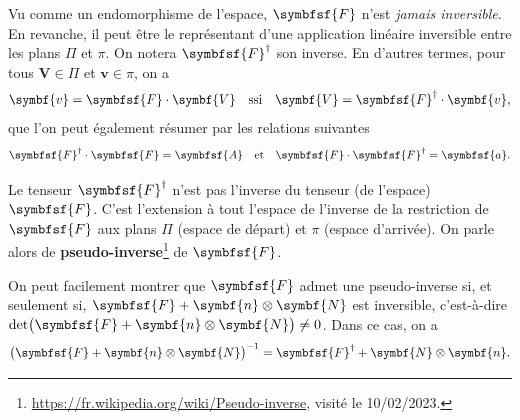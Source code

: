 \documentclass[
  a4paper,
  DIV=11,
  numbers=noendperiod]{scrreprt}
\newcommand{\tens}[1]{\symbfsf{#1}}
\renewcommand{\vec}[1]{\symbf{#1}}
\begin{document}
Vu comme un endomorphisme de l'espace, \(\tens{F}\) n'est \emph{jamais
inversible}. En revanche, il peut être le représentant d'une application
linéaire inversible entre les plans \(\Pi\) et \(\pi\). On notera
\(\tens F^\dagger\) son inverse. En d'autres termes, pour tous
\(\vec{V} \in \Pi\) et \(\vec{v} \in \pi\), on a \[
\vec{v} = \tens{F} \cdot \vec{V} \quad \text{ssi} \quad \vec{V} = \tens{F}^\dagger \cdot \vec{v},
\] que l'on peut également résumer par les relations suivantes \[
\tens{F}^\dagger \cdot \tens{F} = \tens{A} \quad \text{et} \quad \tens{F} \cdot \tens{F}^\dagger = \tens{a}.
\]

\begin{tcolorbox}[enhanced jigsaw, toptitle=1mm, title=\textcolor{quarto-callout-note-color}{\faInfo}\hspace{0.5em}{Note}, colbacktitle=quarto-callout-note-color!10!white, toprule=.15mm, left=2mm, bottomrule=.15mm, arc=.35mm, breakable, opacityback=0, colframe=quarto-callout-note-color-frame, bottomtitle=1mm, titlerule=0mm, leftrule=.75mm, opacitybacktitle=0.6, coltitle=black, rightrule=.15mm, colback=white]

Le tenseur \(\tens{F}^\dagger\) n'est pas l'inverse du tenseur (de
l'espace) \(\tens{F}\). C'est l'extension à tout l'espace de l'inverse
de la restriction de \(\tens{F}\) aux plans \(\Pi\) (espace de départ)
et \(\pi\) (espace d'arrivée). On parle alors de
\textbf{pseudo-inverse}\footnote{\url{https://fr.wikipedia.org/wiki/Pseudo-inverse},
  visité le 10/02/2023.} de \(\tens{F}\).

On peut facilement montrer que \(\tens{F}\) admet une pseudo-inverse si,
et seulement si, \(\tens{F} + \vec{n} \otimes \vec{N}\) est inversible,
c'est-à-dire
\(\det\bigl( \tens F + \vec n \otimes \vec N \bigr) \neq 0\). Dans ce
cas, on a \[
\bigl( \tens{F} + \vec{n} \otimes \vec{N} \bigr)^{-1} = \tens{F}^\dagger + \vec{N} \otimes \vec{n}.
\]

\end{tcolorbox}
\end{document}
